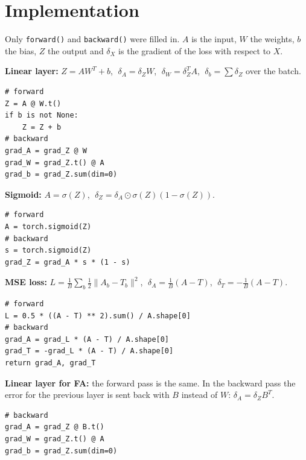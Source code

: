 \documentclass{article}
\begin{document}
\section*{Implementation}

Only \texttt{forward()} and \texttt{backward()} were filled in. $A$ is the input, $W$ the weights, $b$ the bias, $Z$ the output and $\delta_X$ is the gradient of the loss with respect to $X$.

\textbf{Linear layer:} $Z = AW^T + b$, $\;\delta_A = \delta_Z W$, $\;\delta_W = \delta_Z^T A$, $\;\delta_b = \sum \delta_Z$ over the batch.
\begin{lstlisting}
# forward
Z = A @ W.t()
if b is not None:
    Z = Z + b
# backward
grad_A = grad_Z @ W
grad_W = grad_Z.t() @ A
grad_b = grad_Z.sum(dim=0)
\end{lstlisting}

\textbf{Sigmoid:} $A = \sigma(Z)$, $\;\delta_Z = \delta_A \odot \sigma(Z)(1-\sigma(Z))$.
\begin{lstlisting}
# forward
A = torch.sigmoid(Z)
# backward
s = torch.sigmoid(Z)
grad_Z = grad_A * s * (1 - s)
\end{lstlisting}

\textbf{MSE loss:} $L = \frac{1}{B}\sum_b \frac12\lVert A_b - T_b\rVert^2$, $\;\delta_A = \frac1B (A-T)$, $\;\delta_T = -\frac1B (A-T)$.
\begin{lstlisting}
# forward
L = 0.5 * ((A - T) ** 2).sum() / A.shape[0]
# backward
grad_A = grad_L * (A - T) / A.shape[0]
grad_T = -grad_L * (A - T) / A.shape[0]
return grad_A, grad_T
\end{lstlisting}

\textbf{Linear layer for FA:} the forward pass is the same. In the backward pass the error for the previous layer is sent back with $B$ instead of $W$: $\delta_A = \delta_Z B^T$.
\begin{lstlisting}
# backward
grad_A = grad_Z @ B.t()
grad_W = grad_Z.t() @ A
grad_b = grad_Z.sum(dim=0)
\end{lstlisting}
\end{document}
